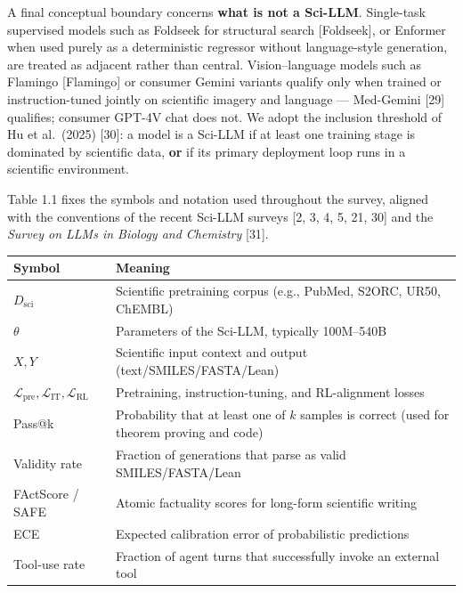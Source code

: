 A final conceptual boundary concerns \textbf{what is not a Sci-LLM}. Single-task supervised models such as Foldseek for structural search {[}Foldseek{]}, or Enformer when used purely as a deterministic regressor without language-style generation, are treated as adjacent rather than central. Vision--language models such as Flamingo {[}Flamingo{]} or consumer Gemini variants qualify only when trained or instruction-tuned jointly on scientific imagery and language --- Med-Gemini {[}29{]} qualifies; consumer GPT-4V chat does not. We adopt the inclusion threshold of Hu et al.~(2025) {[}30{]}: a model is a Sci-LLM if at least one training stage is dominated by scientific data, \textbf{or} if its primary deployment loop runs in a scientific environment.

Table 1.1 fixes the symbols and notation used throughout the survey, aligned with the conventions of the recent Sci-LLM surveys {[}2, 3, 4, 5, 21, 30{]} and the \emph{Survey on LLMs in Biology and Chemistry} {[}31{]}.

{\def\LTcaptype{none} %
\begin{longtable}[]{@{}
  >{\raggedright\arraybackslash}p{}
  >{\raggedright\arraybackslash}p{}@{}}
\toprule\noalign{}
\begin{minipage}[b]{\linewidth}\raggedright
Symbol
\end{minipage} & \begin{minipage}[b]{\linewidth}\raggedright
Meaning
\end{minipage} \\
\midrule\noalign{}
\endhead
\bottomrule\noalign{}
\endlastfoot
\(D_{\text{sci}}\) & Scientific pretraining corpus (e.g., PubMed, S2ORC, UR50, ChEMBL) \\
\(\theta\) & Parameters of the Sci-LLM, typically 100M--540B \\
\(X, Y\) & Scientific input context and output (text/SMILES/FASTA/Lean) \\
\(\mathcal{L}_{\text{pre}}, \mathcal{L}_{\text{IT}}, \mathcal{L}_{\text{RL}}\) & Pretraining, instruction-tuning, and RL-alignment losses \\
Pass@k & Probability that at least one of \(k\) samples is correct (used for theorem proving and code) \\
Validity rate & Fraction of generations that parse as valid SMILES/FASTA/Lean \\
FActScore / SAFE & Atomic factuality scores for long-form scientific writing \\
ECE & Expected calibration error of probabilistic predictions \\
Tool-use rate & Fraction of agent turns that successfully invoke an external tool \\
\end{longtable}
}

